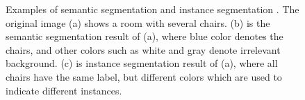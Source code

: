 \begin{figure}[!h]
{	}
    \caption[Examples of semantic and instance segmentation]{Examples of semantic segmentation and instance segmentation \cite{chaireccv}. The original image (a) shows a room with several chairs. (b) is the semantic segmentation result of (a), where blue color denotes the chairs, and other colors such as white and gray denote irrelevant background. (c) is instance segmentation result of (a), where all chairs have the same label, but different colors which are used to indicate different instances.}
	\label{fig:chseg}
\end{figure}